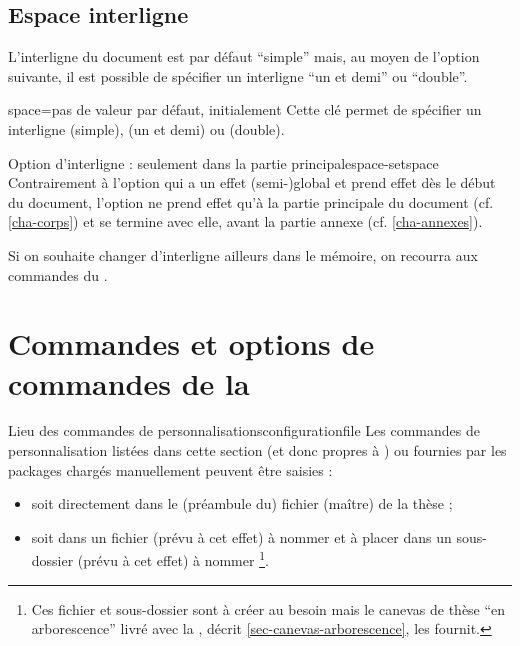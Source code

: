 \subsection{Espace interligne}\label{sec-interligne}

L'interligne du document est par défaut \enquote{simple} mais, au moyen de
l'option  suivante, il est possible de spécifier un interligne
\enquote{un et demi} ou \enquote{double}.

\begin{docKey}{space}{=\textbar{}\textbar{}}{pas de valeur par défaut,
    initialement }
  Cette clé permet de spécifier un interligne  (simple),
   (un et demi) ou  (double).
\end{docKey}

\begin{dbwarning}{Option d'interligne : seulement dans la partie
    principale}{space-setspace}
  Contrairement à l'option  qui a un effet (semi-)global et
  prend effet dès le début du document, l'option  ne prend effet
  qu'à la partie principale du document (cf. \vref{cha-corps}) et se termine
  avec elle, avant la partie annexe (cf. \vref{cha-annexes}).
\end{dbwarning}

Si on souhaite changer d'interligne ailleurs dans le mémoire, on recourra aux
commandes du  .

\section{Commandes et options de commandes de la \yatcl}

\begin{dbremark}{Lieu des commandes de personnalisations}{configurationfile}
  Les commandes de personnalisation listées dans cette section (et donc propres
  à \yatcl{}) ou fournies par les packages chargés manuellement peuvent être
  saisies :
  \begin{itemize}
  \item soit directement dans le (préambule du) fichier (maître) de la thèse ;
  \item soit dans un fichier (prévu à cet effet) à nommer
    \file{\configurationfile} et à placer dans un sous-dossier (prévu à cet
    effet) à nommer \folder{\configurationdirectory}\footnote{Ces fichier et
      sous-dossier sont à créer au besoin mais le canevas de thèse \enquote{en
        arborescence} livré avec la \yatcl, décrit \vref{sec-canevas-arborescence}, les
      fournit.}.
  \end{itemize}
\end{dbremark}

